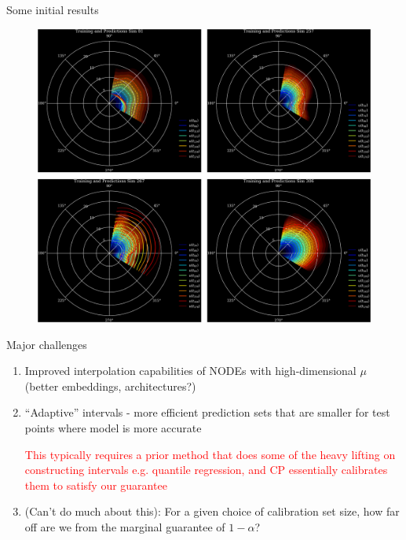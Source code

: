 \documentclass[usenames,dvipsnames]{beamer}
\theoremstyle{definition}
\let\oldcite=\cite
\renewcommand{\cite}[2][]{\textcolor{green}{\oldcite[#1]{#2}}}
\begin{document}
\begin{frame}{Some initial results}

    \begin{figure}
        \centering
        \includegraphics[width=0.8\linewidth]{intervals_fixedcp.png}
        \label{fig:cp_fixed_res}
    \end{figure}

\end{frame}



\begin{frame}{Major challenges}
\begin{enumerate}
    \item Improved interpolation capabilities of NODEs with high-dimensional $\mu$ (better embeddings, architectures?)

    \item ``Adaptive'' intervals - more efficient prediction sets that are smaller for test points where model is more accurate
    
    \textcolor{red}{This typically requires a prior method that does some of the heavy lifting on constructing intervals e.g. quantile regression, and CP essentially calibrates them to satisfy our guarantee}

    \item (Can't do much about this): For a given choice of calibration set size, how far off are we from the marginal guarantee of $1 - \alpha$? 

\end{enumerate}
\end{frame}
\end{document}
